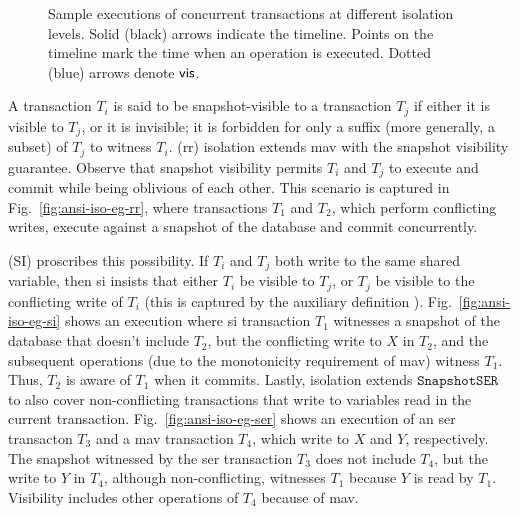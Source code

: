 \begin{figure}
\caption{Sample executions of concurrent transactions at different
isolation levels. Solid (black) arrows indicate the timeline. Points
on the timeline mark the time when an operation is executed. Dotted
(blue) arrows denote $\textsf{vis}$. }
\label{fig:ansi-iso-eg}
\end{figure}

A transaction $T_i$ is said to be snapshot-visible to a transaction
$T_j$ if either it is visible to $T_j$, or it is invisible; it is
forbidden for only a suffix (more generally, a subset) of $T_j$ to
witness $T_i$.   ({\sc rr})
isolation extends {\sc mav} with the snapshot visibility guarantee.
Observe that snapshot visibility permits $T_i$ and $T_j$ to execute
and commit while being oblivious of each other. This scenario is
captured in Fig.~\ref{fig:ansi-iso-eg-rr}, where transactions $T_1$
and $T_2$, which perform conflicting writes, execute against a
snapshot of the database and commit concurrently. 

 ({\sc SI}) proscribes this possibility. If
$T_i$ and $T_j$ both write to the same shared variable, then {\sc si}
insists that either $T_i$ be visible to $T_j$, or $T_j$ be visible to
the conflicting write of $T_i$ (this is captured by the auxiliary
definition ). Fig.~\ref{fig:ansi-iso-eg-si} shows an
execution where {\sc si} transaction $T_1$ witnesses a snapshot of the
database that doesn't include $T_2$, but the conflicting write to $X$
in $T_2$, and the subsequent operations (due to the monotonicity
requirement of {\sc mav}) witness $T_1$. Thus, $T_2$ is aware of $T_1$
when it commits. Lastly,  isolation extends
$\mathtt{SnapshotSER}$ to also cover non-conflicting transactions that
write to variables read in the current transaction.
Fig.~\ref{fig:ansi-iso-eg-ser} shows an execution of an {\sc ser}
transacton $T_3$ and a {\sc mav transaction} $T_4$, which write to $X$
and $Y$, respectively. The snapshot witnessed by the {\sc ser}
transaction $T_3$ does not include $T_4$, but the write to $Y$ in
$T_4$, although non-conflicting, witnesses $T_1$ because $Y$ is read
by $T_1$. Visibility includes other operations of $T_4$ because of
{\sc mav}.


